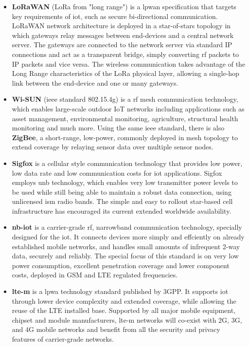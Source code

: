 \begin{itemize}
	\item \textbf{LoRaWAN} (LoRa from "long range") is a \ac{lpwan} specification that targets key requirements of \ac{iot}, such as secure bi-directional communication. LoRaWAN network architecture is deployed in a star-of-stars topology in which gateways relay messages between end-devices and a central network server. The gateways are connected to the network server via standard IP connections and act as a transparent bridge, simply converting \ac{rf} packets to IP packets and vice versa. The wireless communication takes advantage of the Long Range characteristics of the LoRa physical layer, allowing a single-hop link between the end-device and one or many gateways. \cite{lorawan}
	
	\item \textbf{Wi-SUN} (\ac{ieee} standard 802.15.4g) is a \ac{rf} mesh communication technology, which enables large-scale outdoor IoT networks including applications such as asset management, environmental monitoring, agriculture, structural health monitoring and much more. \cite{wi_sun} Using the same \ac{ieee} standard, there is also \textbf{ZigBee}, a short-range, low-power, commonly deployed in mesh topology to extend coverage by relaying sensor data over multiple sensor nodes. \cite{zigbee}
	
	\item \textbf{Sigfox} is a cellular style communication technology that provides low power, low data rate and low communication costs for \ac{iot} applications. Sigfox employs \ac{unb} technology, which enables very low transmitter power levels to be used while still being able to maintain a robust data connection, using unlicensed \ac{ism} radio bands. The simple and easy to rollout star-based cell infrastructure has encouraged its current extended worldwide availability. \cite{sigfox}
	
	\item \textbf{\ac{nb-iot}} is a carrier-grade \ac{rf}, narrowband communication technology, specially designed for the \ac{iot}. It connects devices more simply and effciently on already established mobile networks, and handles small amounts of infrequent 2-way data, securely and reliably. The special focus of this standard is on very low power consumption, excellent penetration coverage and lower component costs, deployed in GSM and LTE regulated frequencies. \cite{nb-iot}
	
	\item \textbf{\ac{lte-m}} is a \ac{lpwa} technology standard published by 3GPP. It supports \ac{iot} through lower device complexity and extended coverage, while allowing the reuse of the LTE installed base. Supported by all major mobile equipment, chipset and module manufacturers, \ac{lte-m} networks will co-exist with 2G, 3G, and 4G mobile networks and benefit from all the security and privacy features of carrier-grade networks. 
	\cite{lte-m}
\end{itemize}


